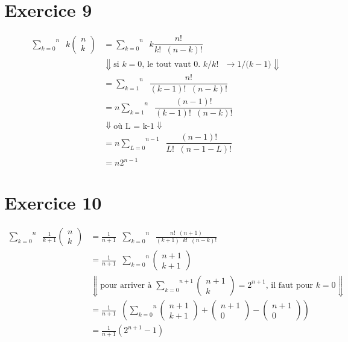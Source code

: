 \documentclass[fontsize=10pt]{article}
\begin{document}
\section*{Exercice 9}
\begin{align*}
\overset{n}{\underset{k= 0}{\sum}}
\phantom{a}k
\begin{pmatrix} 
n\\
k
\end{pmatrix}
& = \overset{n}{\underset{k= 0}{\sum}}
\phantom{a}k\dfrac{n!}{k!\phantom{a}(n-k)!}\\
&\Downarrow\text{si $k=0$, le tout vaut 0. $k/k!$ $\rightarrow 1/(k-1$)}\Downarrow\\
& = \overset{n}{\underset{k= 1}{\sum}}
\phantom{a}\dfrac{n!}{(k-1)!\phantom{a}(n-k)!}\\
& = n\overset{n}{\underset{k= 1}{\sum}}
\phantom{a}\dfrac{(n-1)!}{(k-1)!\phantom{a}(n-k)!}\\
&\Downarrow\text{où L = k-1}\Downarrow\\
& = n\overset{n-1}{\underset{L= 0}{\sum}}
\phantom{a}\dfrac{(n-1)!}{L!\phantom{a}(n-1-L)!}\\
&= n2^{n-1}
\end{align*}






\section*{Exercice 10}
\begin{align*}
\overset{n}{\underset{k= 0}{\sum}}
\phantom{a}\frac{1}{k+1}
\begin{pmatrix}
n\\
k
\end{pmatrix}
& = \frac{1}{n+1}\phantom{a}
\overset{n}{\underset{k= 0}{\sum}}
\phantom{a}\frac{n!\phantom{a}(n+1)}{(k+1)\phantom{a}k!\phantom{a}(n-k)!}\\
& = \frac{1}{n+1}\phantom{a}
\overset{n}{\underset{k= 0}{\sum}}
\begin{pmatrix}
n+1\\
k+1
\end{pmatrix}\\
& \Downarrow\text{pour arriver à }
\overset{n+1}{\underset{k= 0}{\sum}}
\begin{pmatrix}
n+1\\
k
\end{pmatrix} = 2^{n+1} \text{, il faut pour $k=0$}\Downarrow\\
& = \frac{1}{n+1}\phantom{a}
\left( \overset{n}{\underset{k= 0}{\sum}}
\begin{pmatrix}
n+1\\
k+1
\end{pmatrix} + 
\begin{pmatrix}
n+1\\
0
\end{pmatrix} -
\begin{pmatrix}
n+1\\
0
\end{pmatrix} \right)\\
& = \frac{1}{n+1}(2^{n+1}-1)
\end{align*}
\end{document}
